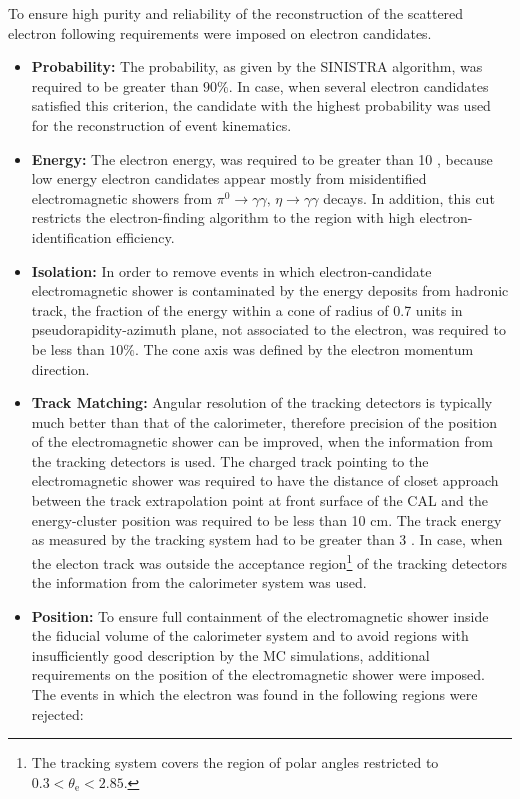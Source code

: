 To ensure high purity and reliability of the reconstruction of the scattered electron following requirements were imposed on electron candidates.
\begin{itemize}
	\item \textbf{Probability:} The probability, as given by the SINISTRA algorithm, was required to be greater than $90\%$. In case, when several electron candidates satisfied this criterion, the candidate with the highest probability was used for the reconstruction of event kinematics.
	\item \textbf{Energy:} The electron energy, \eefin was required to be greater than 10 \GeV, because low energy electron candidates appear mostly from misidentified electromagnetic showers from $\pi^0\rightarrow\gamma\gamma,\, \eta\rightarrow\gamma\gamma$ decays. In addition, this cut restricts the electron-finding algorithm to the region with high electron-identification efficiency.
	\item \textbf{Isolation:} In order to remove events in which electron-candidate electromagnetic shower is contaminated by the energy deposits from hadronic track, the fraction of the energy within a cone of radius of 0.7 units in pseudorapidity-azimuth plane, not associated to the electron, was required to be less than $10\%$. The cone axis was defined by the electron momentum direction.
	\item \textbf{Track Matching:} Angular resolution of the tracking detectors is typically much better than that of the calorimeter, therefore precision of the position of the electromagnetic shower can be improved, when the information from the tracking detectors is used. The charged track pointing to the electromagnetic shower was required to have the distance of closet approach between the track extrapolation point at front surface of the CAL and the energy-cluster position was required to be less than 10 cm. The track energy as measured by the tracking system had to be greater than 3 \GeV. In case, when the electon track was outside the acceptance region\footnote{The tracking system covers the region of polar angles restricted to $0.3 < \theta_\text{e} < 2.85$. } of the tracking detectors the information from the calorimeter system was used.
	\item \textbf{Position:} To ensure full containment of the electromagnetic shower inside the fiducial volume of the calorimeter system and to avoid regions with insufficiently good description by the MC simulations, additional requirements on the position of the electromagnetic shower were imposed. The events in which the electron was found in the following regions were rejected:

\end{itemize}
